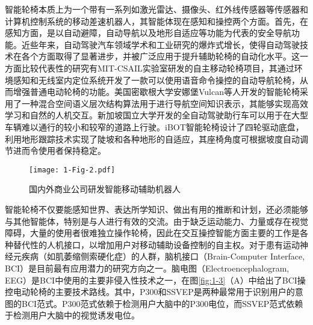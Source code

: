 智能轮椅本质上为一个带有一系列如激光雷达、摄像头、红外线传感器等传感器和计算机控制系统的移动差速机器人\cite{ngIndirectControlAutonomous2020a,leamanComprehensiveReviewSmart2017}，其智能体现在感知和操控两个方面\cite{kimLiteratureReviewSmart2023}。首先，在感知方面，是以自动避障，自动导航以及地形自适应等功能为代表的安全导航功能。近些年来，自动驾驶汽车领域学术和工业研究的爆炸式增长，使得自动驾驶技术在各个方面取得了显著进步，并被广泛应用于提升辅助轮椅的自动化水平。这一方面比较代表性的研究有MIT-CSAIL实验室研发的自主移动轮椅项目\cite{walterFrameworkLearningSemantic2014}，其通过环境感知和无线室内定位系统开发了一款可以使用语音命令操控的自动导航轮椅，从而增强普通电动轮椅的功能。美国密歇根大学安娜堡Vulcan等人\cite{fosterReflectanceFieldMap2023,parkDiscretetimeDynamicModeling2017}开发的智能轮椅采用了一种混合空间语义层次结构算法用于进行导航空间知识表示，其能够实现高效学习和自然的人机交互。新加坡国立大学开发的全自动驾驶助行车\cite{SelfdrivingScooterUnveiled}可以用于在大型车辆难以通行的较小和较窄的道路上行驶。iBOT智能轮椅设计了四轮驱动底盘\cite{MobiusMobilityNext}，利用地形跟踪技术实现了陡坡和各种地形的自适应，其座椅角度可根据坡度自动调节进而令使用者保持稳定。
\begin{figure}[h]
  \centering
  \texttt{[image: 1-Fig-2.pdf]}
  \caption{国内外商业公司研发智能移动辅助机器人}
  \label{fig:1-2}
\end{figure}

智能轮椅不仅要能感知世界、表达所学知识、做出有用的推断和计划，还必须能够与其他智能体，特别是与人进行有效的交流。由于缺乏运动能力、力量或存在视觉障碍，大量的使用者很难独立操作轮椅\cite{hartmanHumanMachineInterfaceSmart2019}，因此在交互操控智能方面主要的工作是各种替代性的人机接口，以增加用户对移动辅助设备控制的自主权。对于患有运动神经元疾病（如肌萎缩侧索硬化症）的人群，脑机接口（Brain-Computer Interface, BCI）是目前最有应用潜力的研究方向之一。脑电图（Electroencephalogram, EEG）是BCI中使用的主要非侵入性技术之一，在图\ref{fig:1-3}（A）中给出了BCI操控电动轮椅的主要技术路线\cite{naserPracticalBCIDrivenWheelchairs2023}。其中，P300和SSVEP是两种最常用于识别用户的意图的BCI范式。P300范式依赖于检测用户大脑中的P300电位\cite{rebsamenBrainControlledWheelchair2010}，而SSVEP范式依赖于检测用户大脑中的视觉诱发电位\cite{dongMultimodalBrainComputer2022,ngIndirectControlAutonomous2020a,mistrySSVEPBasedBrain2018}。

